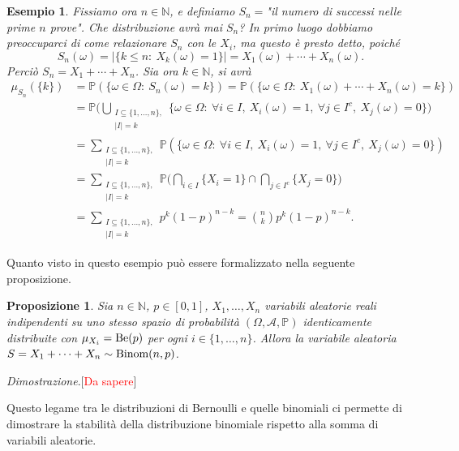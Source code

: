 \documentclass[11pt]{book}
\makeatletter
\theoremstyle{Definizione}
\theoremstyle{TeoremaProposizioneLemmaCorollario}
\newtheorem{mypropo}[myteo]{Proposizione}
\theoremstyle{OsservazioneNota}
\newtheorem{myes}{Esempio}[section]
\renewenvironment{proof}[1][\proofname]{\par
  \normalfont \topsep6\p@\@plus6\p@\relax
  \trivlist
  \item[\hskip\labelsep
        \itshape
    #1\@addpunct{.}]\ignorespaces
}{%
  \endtrivlist\@endpefalse
}
\newcommand{\N}{\mathbb{N}}
\renewcommand{\P}{\mathbb{P}}
\renewenvironment{proof}{\textsl{Dimostrazione}.}{}
\makeatother
\begin{document}
\begin{myes}
Fissiamo ora $n \in \N$, e definiamo $S_n = $"il numero di successi nelle prime $n$ prove". Che distribuzione avrà mai $S_n$? In primo luogo dobbiamo preoccuparci di come relazionare $S_n$ con le $X_i$, ma questo è presto detto, poiché 
$$
S_n(\omega) = |\{k\leq n:\ X_k(\omega) = 1\}| = X_1(\omega)+ \cdots + X_n(\omega).
$$
Perciò $S_n = X_1 + \cdots + X_n$. Sia ora $k\in \N$, si avrà
\begin{align*}
\mu_{S_n}(\{k\}) &= \P(\{\omega\in \Omega:\ S_n(\omega) = k\}) = \P(\{\omega\in \Omega:\ X_1(\omega) + \cdots + X_n(\omega) = k\}) \\
&=\P\Bigg(\bigcup_{\substack{ I \subseteq \{1,\dots,n\},\\ |I| = k}} \{\omega\in \Omega:\ \forall i \in I,\ X_i(\omega) = 1,\ \forall j\in I^c,\ X_j(\omega) = 0\}\Bigg) \\
&= \sum_{\substack{I \subseteq \{1,\dots,n\},\\ |I| = k}} \P(\{\omega\in \Omega:\ \forall i\in I,\ X_i(\omega) = 1,\ \forall j\in I^c,\ X_j(\omega) = 0\}) \\
&= \sum_{\substack{I \subseteq \{1,\dots,n\},\\ |I| = k}} \P\Bigg(\bigcap_{i\in I} \{X_i = 1\} \cap \bigcap_{j\in I^c} \{X_j = 0\}\Bigg)\\
&= \sum_{\substack{I \subseteq \{1,\dots,n\},\\ |I| = k}} p^{k}(1-p)^{n-k} = \binom{n}{k}p^k(1-p)^{n-k}.
\end{align*}
\end{myes}
Quanto visto in questo esempio può essere formalizzato nella seguente proposizione.
\begin{boxpro}
\begin{mypropo}\label{pro:SommaDiBernoulliIndipendentiIsBinomiale}
Sia $n\in \N$, $p\in [0,1]$, $X_1,\dots,X_n$ variabili aleatorie reali indipendenti su uno stesso spazio di probabilità $(\Omega,\mathcal{A},\P)$ identicamente distribuite con $\mu_{X_i} = \textup{Be}(p)$ per ogni $i\in \{1,\dots,n\}$. Allora la variabile aleatoria $S = X_1+\cdots+X_n \sim \textup{Binom}(n,p)$.
\end{mypropo}
\tcblower
\begin{proof}[\textcolor{red}{Da sapere}]

\end{proof}
\end{boxpro}
\noindent
Questo legame tra le distribuzioni di Bernoulli e quelle binomiali ci permette di dimostrare la stabilità della distribuzione binomiale rispetto alla somma di variabili aleatorie.
\end{document}
